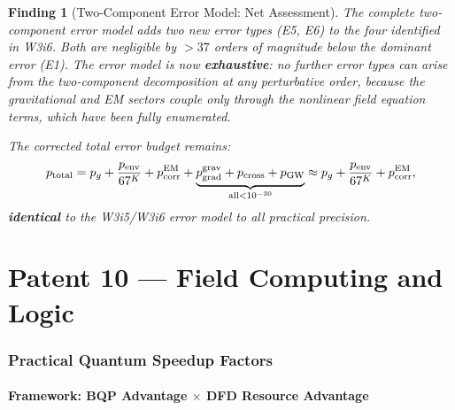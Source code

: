 \documentclass[11pt]{article}
\newtheorem{finding}[theorem]{Finding}
\theoremstyle{definition}
\theoremstyle{remark}
\begin{document}
\begin{finding}[Two-Component Error Model: Net Assessment]
\label{finding:two-comp-assessment}
The complete two-component error model adds two new error types
(E5, E6) to the four identified in W3i6. Both are negligible by
$>37$ orders of magnitude below the dominant error (E1). The error
model is now \textbf{exhaustive}: no further error types can arise
from the two-component decomposition at any perturbative order,
because the gravitational and EM sectors couple only through the
nonlinear field equation terms, which have been fully enumerated.

The corrected total error budget remains:
\begin{equation}
  p_{\rm total} = p_g + \frac{p_{\rm env}}{67^K}
  + p_{\rm corr}^{\rm EM}
  + \underbrace{p_{\rm grad}^{\rm grav}
  + p_{\rm cross} + p_{\rm GW}}_{\text{all} < 10^{-30}}
  \approx p_g + \frac{p_{\rm env}}{67^K} + p_{\rm corr}^{\rm EM},
\end{equation}
\textbf{identical} to the W3i5/W3i6 error model to all practical
precision.
\end{finding}


\newpage
\part{Patent 10 --- Field Computing and Logic}

\section{Practical Quantum Speedup Factors}
\label{sec:practical-speedup}

\subsection{Framework: BQP Advantage $\times$ DFD Resource Advantage}
\label{sec:framework}
\end{document}
